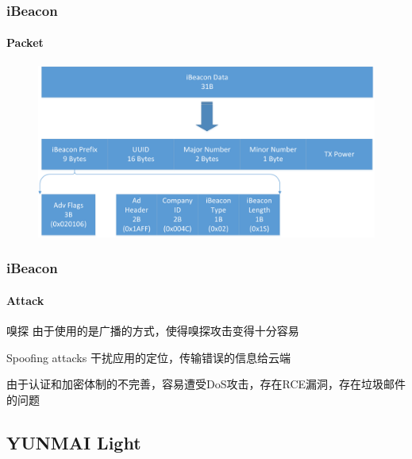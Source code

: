 \documentclass[UTF8]{ctexbeamer}
\begin{document}
\begin{frame}
  \frametitle{iBeacon}
  \framesubtitle{Packet}
  \begin{figure}
    \includegraphics[width=0.9\linewidth]{ibeacon-packet.jpg}
  \end{figure}
\end{frame}

\begin{frame}
  \frametitle{iBeacon}
  \framesubtitle{Attack}
  \begin{block}{嗅探}
    由于使用的是广播的方式，使得嗅探攻击变得十分容易
  \end{block}
  \begin{block}{Spoofing attacks}
    干扰应用的定位，传输错误的信息给云端
  \end{block}
  \begin{block}{}
  由于认证和加密体制的不完善，容易遭受DoS攻击，存在RCE漏洞，存在垃圾邮件的问题
  \end{block}
\end{frame}



\subsection{YUNMAI Light}
\end{document}
